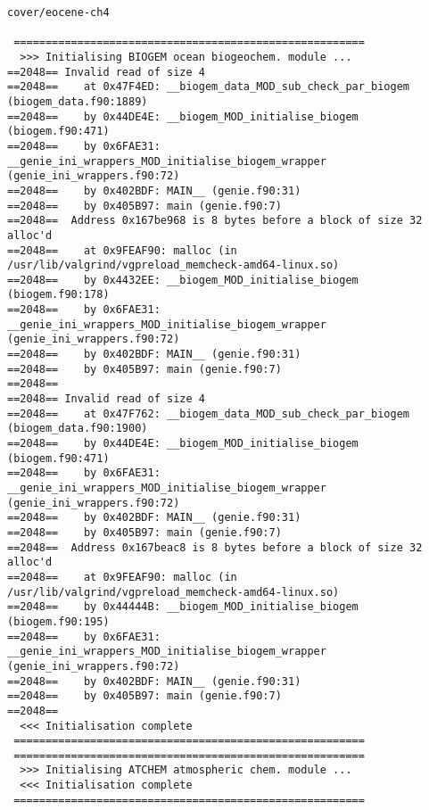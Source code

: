 \documentclass[a4paper,10pt,article]{memoir}
\begin{document}
\begin{verbatim}
cover/eocene-ch4

 =======================================================
  >>> Initialising BIOGEM ocean biogeochem. module ...
==2048== Invalid read of size 4
==2048==    at 0x47F4ED: __biogem_data_MOD_sub_check_par_biogem (biogem_data.f90:1889)
==2048==    by 0x44DE4E: __biogem_MOD_initialise_biogem (biogem.f90:471)
==2048==    by 0x6FAE31: __genie_ini_wrappers_MOD_initialise_biogem_wrapper (genie_ini_wrappers.f90:72)
==2048==    by 0x402BDF: MAIN__ (genie.f90:31)
==2048==    by 0x405B97: main (genie.f90:7)
==2048==  Address 0x167be968 is 8 bytes before a block of size 32 alloc'd
==2048==    at 0x9FEAF90: malloc (in /usr/lib/valgrind/vgpreload_memcheck-amd64-linux.so)
==2048==    by 0x4432EE: __biogem_MOD_initialise_biogem (biogem.f90:178)
==2048==    by 0x6FAE31: __genie_ini_wrappers_MOD_initialise_biogem_wrapper (genie_ini_wrappers.f90:72)
==2048==    by 0x402BDF: MAIN__ (genie.f90:31)
==2048==    by 0x405B97: main (genie.f90:7)
==2048==
==2048== Invalid read of size 4
==2048==    at 0x47F762: __biogem_data_MOD_sub_check_par_biogem (biogem_data.f90:1900)
==2048==    by 0x44DE4E: __biogem_MOD_initialise_biogem (biogem.f90:471)
==2048==    by 0x6FAE31: __genie_ini_wrappers_MOD_initialise_biogem_wrapper (genie_ini_wrappers.f90:72)
==2048==    by 0x402BDF: MAIN__ (genie.f90:31)
==2048==    by 0x405B97: main (genie.f90:7)
==2048==  Address 0x167beac8 is 8 bytes before a block of size 32 alloc'd
==2048==    at 0x9FEAF90: malloc (in /usr/lib/valgrind/vgpreload_memcheck-amd64-linux.so)
==2048==    by 0x44444B: __biogem_MOD_initialise_biogem (biogem.f90:195)
==2048==    by 0x6FAE31: __genie_ini_wrappers_MOD_initialise_biogem_wrapper (genie_ini_wrappers.f90:72)
==2048==    by 0x402BDF: MAIN__ (genie.f90:31)
==2048==    by 0x405B97: main (genie.f90:7)
==2048==
  <<< Initialisation complete
 =======================================================
 =======================================================
  >>> Initialising ATCHEM atmospheric chem. module ...
  <<< Initialisation complete
 =======================================================


\end{verbatim}
\end{document}
